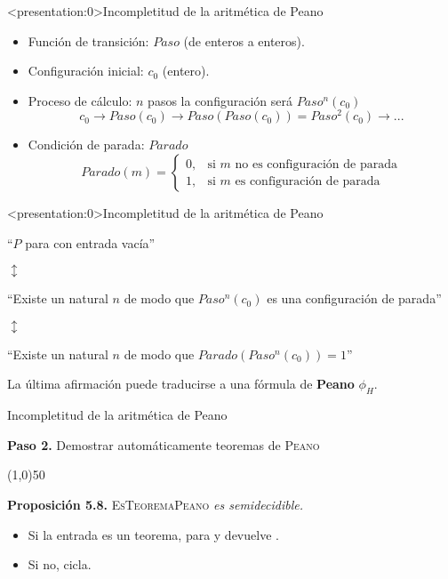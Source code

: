 \documentclass[10pt,xcolor=dvipsnames,aspectratio=169,spanish]{beamer}
\newcommand{\palabra}[1]{\texttt{\textquotesingle{}{#1}\textquotesingle{}}}
\begin{document}
\begin{frame}<presentation:0>{Incompletitud de la aritmética de Peano}

\begin{itemize}
    \item Función de transición: $Paso$ (de enteros a enteros).
    \pause
    \item Configuración inicial: $c_0$ (entero).
    \pause
    \item Proceso de cálculo: $n$ pasos la configuración será $Paso^n(c_0)$
    $$
    c_0 \rightarrow Paso(c_0) \rightarrow Paso(Paso(c_0)) = Paso^2(c_0) \rightarrow ...
    $$
    \pause
    \vspace*{-5mm}
    \item Condición de parada: $Parado$
    $$
    Parado(m) =
    \begin{cases} 
      0, & \text{si }m\text{ no es configuración de parada} \\
      1, & \text{si }m\text{ es configuración de parada}
   \end{cases}
    $$
\end{itemize}

\end{frame}

\begin{frame}<presentation:0>{Incompletitud de la aritmética de Peano}

\begin{center}
    ``$P$ para con entrada vacía''

    \pause
    $\updownarrow$

    ``Existe un natural $n$ de modo que $Paso^n(c_0)$ es una configuración de parada''

    \pause
    $\updownarrow$

    ``Existe un natural $n$ de modo que $Parado(Paso^n(c_0))=1$''
\end{center}

\pause
La última afirmación puede traducirse a una fórmula de \textbf{Peano} $\phi_H$.\hfill\square

\end{frame}

\begin{frame}{Incompletitud de la aritmética de Peano}

\begin{center}
    \textbf{Paso 2.} Demostrar automáticamente teoremas de \textsc{Peano}

    \line(1,0){50}
\end{center}

\vspace{5mm}

\textbf{Proposición 5.8.} \textsc{EsTeoremaPeano} \emph{es semidecidible.}

\pause
\begin{itemize}
    \item Si la entrada es un teorema, para y devuelve \palabra{sí}.
    \item Si no, cicla.
\end{itemize}

\end{frame}
\end{document}
